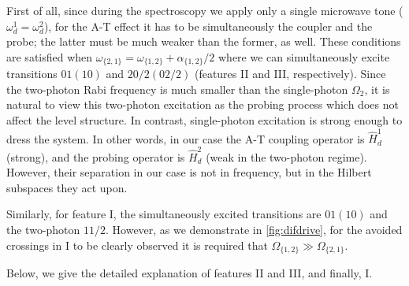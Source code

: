 \documentclass[%
 pra,
 amsmath,amssymb,
 reprint,%
]{revtex4-1}
\begin{document}
First of all, since during the spectroscopy we 
apply only a single microwave tone ($\omega_d^1 = 
\omega_d^2$), for the A-T effect it has to be 
simultaneously the coupler and the probe; the 
latter must be much weaker than the former, as 
well. These conditions are satisfied when 
$\omega_{\{2,1\}} = 
\omega_{\{1,2\}}+\alpha_{\{1,2\}}/2$  where we 
can simultaneously excite transitions $01 (10)$ 
and $20/2 (02/2)$ (features II and III, 
respectively). Since the two-photon Rabi 
frequency is much smaller than the single-photon 
$\Omega_2$, it is natural to view this two-photon 
excitation as the probing process which does not 
affect the level structure. In contrast, 
single-photon excitation is strong enough to 
dress the system. In other words, in our case the 
A-T coupling operator is $\hat H_{d}^1$ (strong), 
and the probing operator is $\hat H_{d}^2$ (weak 
in the two-photon regime). However, their 
separation in our case is not in frequency, but 
in the Hilbert subspaces they act upon.

Similarly, for feature I, the simultaneously 
excited transitions are $01(10)$ and the 
two-photon $11/2$. However, as we demonstrate in 
\autoref{fig:difdrive}, for the avoided crossings 
in I to be clearly observed it is required that 
$\Omega_{\{1,2\}} \gg \Omega_{\{2,1\}}$. 

Below, we give the detailed explanation of features II and III, and finally, I.
\end{document}

